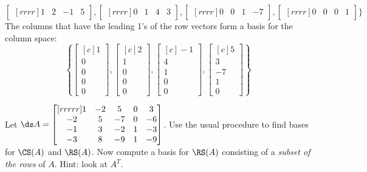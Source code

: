\begin{solution}
$$\begin{bmatrix}[rrrr]
1&2&-1&5
\end{bmatrix},
\begin{bmatrix}[rrrr]
0&1&4&3
\end{bmatrix},
\begin{bmatrix}[rrrr]
0&0&1&-7
\end{bmatrix},
\begin{bmatrix}[rrrr]
0&0&0&1
\end{bmatrix}
\}
$$
The columns that have the leading 1's of the row vectors form a basis for the column space:
$$
\left\{
\begin{bmatrix}[c]
1\\
0\\
0\\
0\\
0
\end{bmatrix},
\begin{bmatrix}[c]
2\\
1\\
0\\
0\\
0
\end{bmatrix},
\begin{bmatrix}[c]
-1\\
4\\
1\\
0\\
0
\end{bmatrix},
\begin{bmatrix}[c]
5\\
3\\
-7\\
1\\
0
\end{bmatrix}
\right\}
$$
\end{solution}
\ii Let 
$\ds A=
\begin{bmatrix}[rrrrr]
1&-2&5&0&3\\
-2&5&-7&0&-6\\
-1&3&-2&1&-3\\
-3&8&-9&1&-9
\end{bmatrix}
$.
\bb
\ii 
Use the usual procedure to find bases for $\CS(A)$ and $\RS(A)$. 
\ii Now compute a basis for $\RS(A)$ consisting of a {\em subset of the rows}  of $A$. Hint: look at $A^T$. 
\ee
